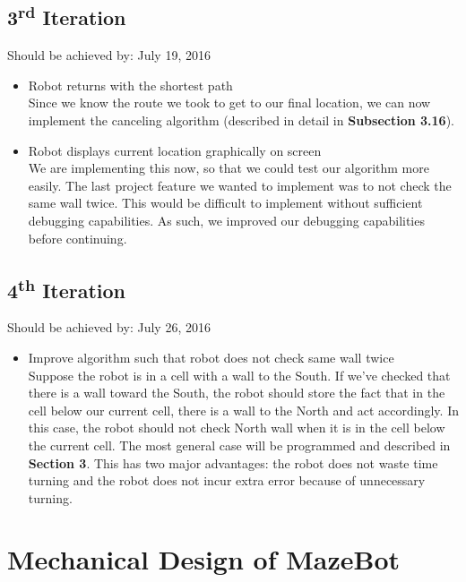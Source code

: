\documentclass[11pt]{article}
\newcommand{\ts}{\textsuperscript}
\begin{document}
\subsection{3\ts{rd} Iteration}
Should be achieved by: July 19, 2016
\begin{itemize}
\item Robot returns with the shortest path\\
Since we know the route we took to get to our final location, we can now implement the canceling algorithm (described in detail in \textbf{Subsection 3.16}).
\item Robot displays current location graphically on screen\\
We are implementing this now, so that we could test our algorithm more easily. The last project feature we wanted to implement was to not check the same wall twice. This would be difficult to implement without sufficient debugging capabilities. As such, we improved our debugging capabilities before continuing.
\end{itemize}

\subsection{4\ts{th} Iteration}
Should be achieved by: July 26, 2016
\begin{itemize}
\item Improve algorithm such that robot does not check same wall twice\\
Suppose the robot is in a cell with a wall to the South. If we've checked that there is a wall toward the South, the robot should store the fact that in the cell below our current cell, there is a wall to the North and act accordingly. In this case, the robot should not check North wall when it is in the cell below the current cell. The most general case will be programmed and described in \textbf{Section 3}. This has two major advantages: the robot does not waste time turning and the robot does not incur extra error because of unnecessary turning.
\end{itemize}
\newpage




\section{Mechanical Design of MazeBot}
\end{document}
